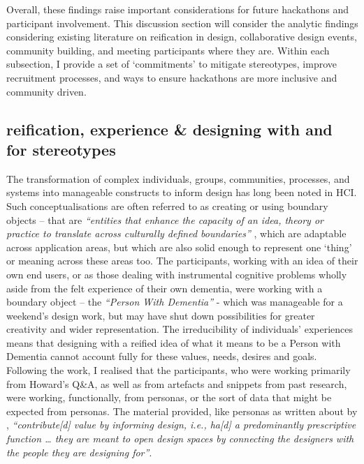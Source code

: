 Overall, these findings raise important considerations for future hackathons and participant involvement. This discussion section will consider the analytic findings considering existing literature on reification in design, collaborative design events, community building, and meeting participants where they are. Within each subsection, I provide a set of ‘commitments’ to mitigate stereotypes, improve recruitment processes, and ways to ensure hackathons are more inclusive and community driven. 

\subsection{reification, experience \& designing with and for stereotypes}
\label{DiscussionPartOne}
The transformation of complex individuals, groups, communities, processes, and systems into manageable constructs to inform design has long been noted in HCI. Such conceptualisations are often referred to as creating or using boundary objects – that are \textit{``entities that enhance the capacity of an idea, theory or practice to translate across culturally defined boundaries''} \cite[pg.71]{fox2011boundary}, which are adaptable across application areas, but which are also solid enough to represent one `thing' or meaning across these areas too. The participants, working with an idea of their own end users, or as those dealing with instrumental cognitive problems wholly aside from the felt experience of their own dementia, were working with a boundary object – the \textit{``Person With Dementia''} - which was manageable for a weekend’s design work, but may have shut down possibilities for greater creativity and wider representation. The irreducibility of individuals’ experiences means that designing with a reified idea of what it means to be a Person with Dementia cannot account fully for these values, needs, desires and goals. Following the work, I realised that the participants, who were working primarily from Howard’s Q\&A, as well as from artefacts and snippets from past research, were working, functionally, from personas, or the sort of data that might be expected from personas. The material provided, like personas as written about by \cite{marsden_stereotypes_2016}, \textit{``contribute[d] value by informing design, i.e., ha[d] a predominantly prescriptive function … they are meant to open design spaces by connecting the designers with the people they are designing for''}. 


